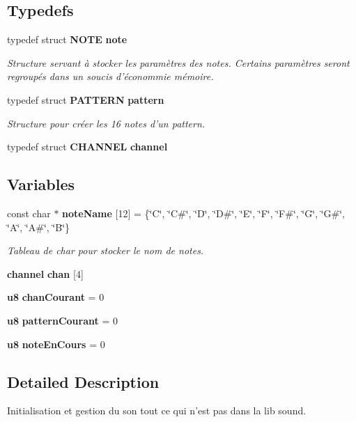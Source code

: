 \subsection*{Typedefs}
\begin{DoxyCompactItemize}
\item 
typedef struct {\bf NOTE} {\bf note}\label{son_8h_a62e7fe797b4ff926a53be7d31640dfd1}

\begin{DoxyCompactList}\small\item\em Structure servant à stocker les paramètres des notes. Certains paramètres seront regroupés dans un soucis d'économmie mémoire. \item\end{DoxyCompactList}\item 
typedef struct {\bf PATTERN} {\bf pattern}\label{son_8h_a1de7d1b0b76cc4c3f46ce9fb4fe98c8a}

\begin{DoxyCompactList}\small\item\em Structure pour créer les 16 notes d'un pattern. \item\end{DoxyCompactList}\item 
typedef struct {\bf CHANNEL} {\bfseries channel}\label{son_8h_ab77933e2e1fc604055c1d8d2703df98a}

\end{DoxyCompactItemize}
\subsection*{Variables}
\begin{DoxyCompactItemize}
\item 
const char $\ast$ {\bf noteName} [12] = \{\char`\"{}C\char`\"{}, \char`\"{}C\#\char`\"{}, \char`\"{}D\char`\"{}, \char`\"{}D\#\char`\"{}, \char`\"{}E\char`\"{}, \char`\"{}F\char`\"{}, \char`\"{}F\#\char`\"{}, \char`\"{}G\char`\"{}, \char`\"{}G\#\char`\"{}, \char`\"{}A\char`\"{}, \char`\"{}A\#\char`\"{}, \char`\"{}B\char`\"{}\}\label{son_8h_acc7f9239975764f08ef55b6e96c11aa7}

\begin{DoxyCompactList}\small\item\em Tableau de char pour stocker le nom de notes. \item\end{DoxyCompactList}\item 
{\bf channel} {\bfseries chan} [4]\label{son_8h_a227d5d974f990540c3d2807d3986606f}

\item 
{\bf u8} {\bfseries chanCourant} = 0\label{son_8h_a9c1e119e34d5833e5c4b489b95e6b4ef}

\item 
{\bf u8} {\bfseries patternCourant} = 0\label{son_8h_afcd80d23f1f5d1bf6744b833b5ec5e0b}

\item 
{\bf u8} {\bfseries noteEnCours} = 0\label{son_8h_a775d8e140f454b771d27a03bb818a8bc}

\end{DoxyCompactItemize}


\subsection{Detailed Description}
Initialisation et gestion du son tout ce qui n'est pas dans la lib sound. 